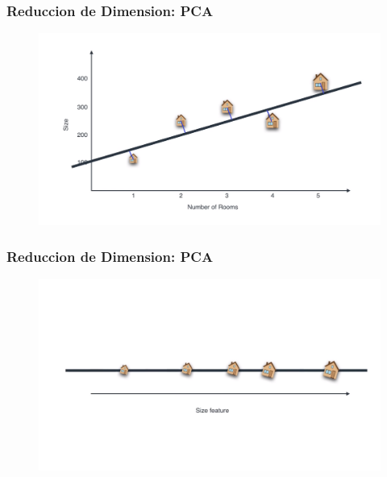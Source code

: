 \documentclass[
  shownotes,
  xcolor={svgnames},
  hyperref={colorlinks,citecolor=DarkBlue,linkcolor=DarkRed,urlcolor=DarkBlue}
  , aspectratio=169]{beamer}
\begin{document}
\begin{frame}
\frametitle{Reduccion de Dimension: PCA}

\begin{figure}[H] \centering

    \centering
    \includegraphics[scale=.25]{figures/pca2}
  \\
  \tiny
\end{figure}



\end{frame}
\begin{frame}
\frametitle{Reduccion de Dimension: PCA}

\begin{figure}[H] \centering

    \centering
    \includegraphics[scale=.25]{figures/pca3}
  \\
  \tiny
\end{figure}


\end{frame}
\end{document}
